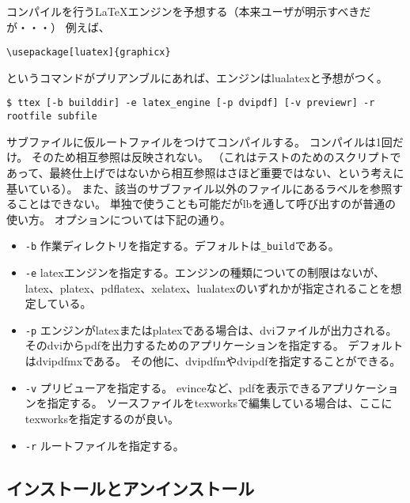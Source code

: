 コンパイルを行うLaTeXエンジンを予想する（本来ユーザが明示すべきだが・・・）
例えば、

\begin{verbatim}
\usepackage[luatex]{graphicx}
\end{verbatim}

というコマンドがプリアンブルにあれば、エンジンはlualatexと予想がつく。

\begin{verbatim}
$ ttex [-b builddir] -e latex_engine [-p dvipdf] [-v previewr] -r rootfile subfile
\end{verbatim}

サブファイルに仮ルートファイルをつけてコンパイルする。
コンパイルは1回だけ。 そのため相互参照は反映されない。
（これはテストのためのスクリプトであって、最終仕上げではないから相互参照はさほど重要ではない、という考えに基いている）。
また、該当のサブファイル以外のファイルにあるラベルを参照することはできない。
単独で使うことも可能だがlbを通して呼び出すのが普通の使い方。
オプションについては下記の通り。

\begin{itemize}
\tightlist
\item
  \texttt{-b}
  作業ディレクトリを指定する。デフォルトは\texttt{\_build}である。
\item
  \texttt{-e}
  latexエンジンを指定する。エンジンの種類についての制限はないが、latex、platex、pdflatex、xelatex、lualatexのいずれかが指定されることを想定している。
\item
  \texttt{-p}
  エンジンがlatexまたはplatexである場合は、dviファイルが出力される。
  そのdviからpdfを出力するためのアプリケーションを指定する。
  デフォルトはdvipdfmxである。
  その他に、dvipdfmやdvipdfを指定することができる。
\item
  \texttt{-v} プリビューアを指定する。
  evinceなど、pdfを表示できるアプリケーションを指定する。
  ソースファイルをtexworksで編集している場合は、ここにtexworksを指定するのが良い。
\item
  \texttt{-r} ルートファイルを指定する。
\end{itemize}

\hypertarget{ux30a4ux30f3ux30b9ux30c8ux30fcux30ebux3068ux30a2ux30f3ux30a4ux30f3ux30b9ux30c8ux30fcux30eb}{%
\subsection{インストールとアンインストール}\label{ux30a4ux30f3ux30b9ux30c8ux30fcux30ebux3068ux30a2ux30f3ux30a4ux30f3ux30b9ux30c8ux30fcux30eb}}

